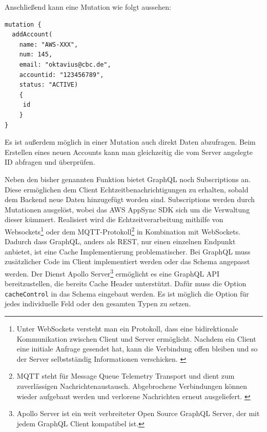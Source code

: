 Anschließend kann eine Mutation wie folgt aussehen:

\begin{lstlisting}[basicstyle=\ttfamily, breaklines=true , frame = single, backgroundcolor=\color{flashwhite} ]
mutation {
  addAccount(
    name: "AWS-XXX",
    num: 145,
    email: "oktavius@cbc.de",
    accountid: "123456789",
    status: "ACTIVE)
    {
     id
    }
}
\end{lstlisting}

Es ist außerdem möglich in einer Mutation auch direkt Daten abzufragen. Beim Erstellen eines neuen Accounts kann man gleichzeitig die
vom Server angelegte ID abfragen und überprüfen.\cite[]{GraphQL1}

Neben den bisher genannten Funktion bietet GraphQL noch Subscriptions an.
Diese ermöglichen dem Client Echtzeitbenachrichtigungen zu erhalten, sobald dem Backend neue Daten hinzugefügt worden sind.
Subscriptions werden durch Mutationen ausgelöst, wobei das AWS AppSync SDK sich um die Verwaltung dieser kümmert.
Realisiert wird die Echtzeitverarbeitung mithilfe von Websockets\footnote{Unter WebSockets versteht man ein Protokoll, dass eine bidirektionale Kommunikation zwischen Client und Server ermöglicht. Nachdem ein Client eine initiale Anfrage gesendet hat, kann die Verbindung offen bleiben und so der Server selbstständig Informationen verschicken. \cite[]{Websockets}}
oder dem MQTT-Protokoll\footnote{MQTT steht für Message Queue Telemetry Transport und dient zum zuverlässigen Nachrichtenaustausch. Abgebrochene Verbindungen können wieder aufgebaut werden und verlorene Nachrichten erneut ausgeliefert. \cite[]{MQTT} } in Kombination mit WebSockets. \cite[]{GraphQLSubs}
Dadurch dass GraphQL, anders als REST, nur einen einzelnen Endpunkt anbietet, ist eine Cache Implementierung problematischer.
Bei GraphQL muss zusätzlicher Code im Client implementiert werden oder das Schema angepasst werden.
Der Dienst Apollo Server\footnote{Apollo Server ist ein weit verbreiteter Open Source GraphQL Server, der mit jedem GraphQL Client kompatibel ist.} ermöglicht es
eine GraphQL API bereitzustellen, die bereits Cache Header unterstützt.
Dafür muss die Option \verb+cacheControl+ in das Schema eingebaut werden.
Es ist möglich die Option für jedes individuelle Feld oder den gesamten Typen zu setzen. \cite[]{Apollo}
\cite[]{GraphQL} \cite[]{GraphQL1}


